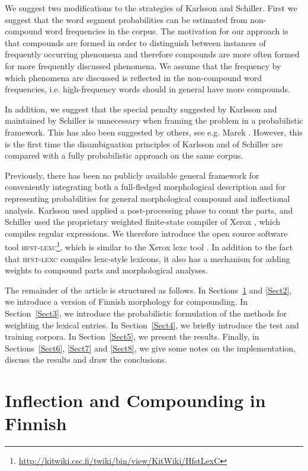 \documentclass[11pt]{article}
\begin{document}
We suggest two modifications to the strategies of Karlsson and
Schiller. First we suggest that the word segment probabilities can be
estimated from non-compound word frequencies in the corpus. The
motivation for our approach is that compounds are formed in order to
distinguish between instances of frequently occurring phenomena and
therefore compounds are more often formed for more frequently
discussed phenomena. We assume that the frequency by which phenomena
are discussed is reflected in the non-compound word frequencies,
i.e. high-frequency words should in general have more compounds.

In addition, we suggest that the special penalty suggested by Karlsson
and maintained by Schiller is unnecessary when framing the problem in
a probabilistic framework. This has also been suggested by others, see
e.g. Marek \cite{marek/2006}. However, this is the first time the
disambiguation principles of Karlsson and of Schiller are compared
with a fully probabilistic approach on the same corpus.

Previously, there has been no publicly available general framework for
conveniently integrating both a full-fledged morphological description
and for representing probabilities for general morphological compound
and inflectional analysis. Karlsson \cite{karlsson/1992} used
applied a post-processing phase to count the parts, and Schiller
\cite{schiller/2005} used the proprietary weighted finite-state compiler
of Xerox \cite{kempe/2003}, which compiles regular expressions. We
therefore introduce the open source software tool
\textsc{hfst-lexc}\footnote{\url{http://kitwiki.csc.fi/twiki/bin/view/KitWiki/HfstLexC}},
which is similar to the Xerox lexc tool \cite{beesley/2003}. In
addition to the fact that \textsc{hfst-lexc} compiles lexc-style
lexicons, it also has a mechanism for adding weights to compound parts
and morphological analyses.

The remainder of the article is structured as follows. In
Sections~\ref{Sect1} and \ref{Sect2}, we introduce a version of
Finnish morphology for compounding. In Section~\ref{Sect3}, we
introduce the probabilistic formulation of the methods for weighting
the lexical entries. In Section~\ref{Sect4}, we briefly introduce the
test and training corpora. In Section~\ref{Sect5}, we present the
results. Finally, in Sections~\ref{Sect6}, \ref{Sect7} and
\ref{Sect8}, we give some notes on the implementation, discuss the
results and draw the conclusions.

\section{Inflection and Compounding in Finnish}
\label{Sect1}
\end{document}
